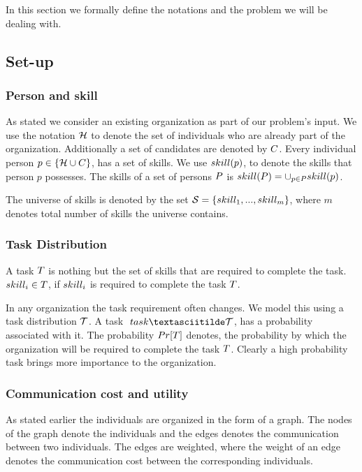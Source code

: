 In this section we formally define the notations and the problem we will be dealing with.
\subsection{Set-up}

\subsubsection{Person and skill}

As stated we consider an existing organization as part of our problem's input. We use the notation $\mathcal{H}$ to denote the set of individuals who are already part of the organization. Additionally a set of candidates are denoted by ${C}$. Every individual person $p \in \{\mathcal{H} \cup {C}\}$, has a set of skills. We use $skill(p)$, to denote the skills that person $p$ possesses. The skills of a set of persons $P$ is $skill(P) = \cup_{p \in P} skill(p)$.

The universe of skills is denoted by the set $\mathcal{S} = \{ skill_1, ..., skill_m \}$, where $m$ denotes total number of skills the universe contains.

\subsubsection{Task Distribution}

A task $T$ is nothing but the set of skills that are required to complete the task. $skill_i \in T$, if $skill_i$ is required to complete the task $T$.

In any organization the task requirement often changes. We model this using a task distribution $\mathcal{T}$. A task $\
task \textasciitilde \tasks$, has a probability associated with it. The probability $Pr[T]$ denotes, the probability by which the organization will be required to complete the task $T$. Clearly a high probability task brings more importance to the organization. 

\subsubsection{Communication cost and utility}

As stated earlier the individuals are organized in the form of a graph. The nodes of the graph denote the individuals and the edges denotes the communication between two individuals. The edges are weighted, where the weight of an edge denotes the communication cost between the corresponding individuals.

